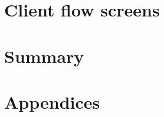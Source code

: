 \documentclass[12pt, a4paper]{report}
\begin{document}
    \chapter{Client flow screens}\label{ch:client_flow_screens}
    

    \chapter{Summary}\label{ch:summary}
    

    \pagebreak
    \printbibliography

    \pagebreak
    \appendix
    \chapter*{Appendices}
    \renewcommand{\thechapter}{\arabic{chapter}}

%    
\end{document}
